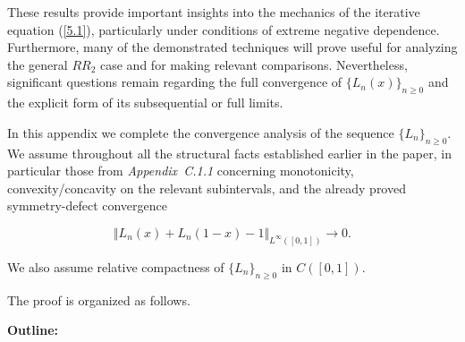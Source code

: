 \documentclass[onecolumn]{article}
\begin{document}
These results provide important insights into the mechanics of the iterative
equation (\ref{5.1}), particularly under conditions of extreme negative
dependence. Furthermore, many of the demonstrated techniques will prove
useful for analyzing the general $RR_{2}$ case and for making relevant
comparisons. Nevertheless, significant questions remain regarding the full
convergence of $\{L_{n}(x)\}_{n\geq 0}$ and the explicit form of its
subsequential or full limits.

In this appendix we complete the convergence analysis of the sequence $%
\{L_{n}\}_{n\geq 0}$. We assume throughout all the structural facts
established earlier in the paper, in particular those from \textit{%
Appendix~C.1.1} concerning monotonicity, convexity/concavity on the relevant
subintervals, and the already proved symmetry-defect convergence

\begin{equation}
\Vert L_{n}(x)+L_{n}(1-x)-1\Vert _{L^{\infty }([0,1])}\longrightarrow 0.
\label{1600}
\end{equation}

We also assume relative compactness of $\{L_{n}\}_{n\geq 0}$ in $C([0,1])$.

The proof is organized as follows.

\medskip \noindent \textbf{Outline:}
\end{document}
